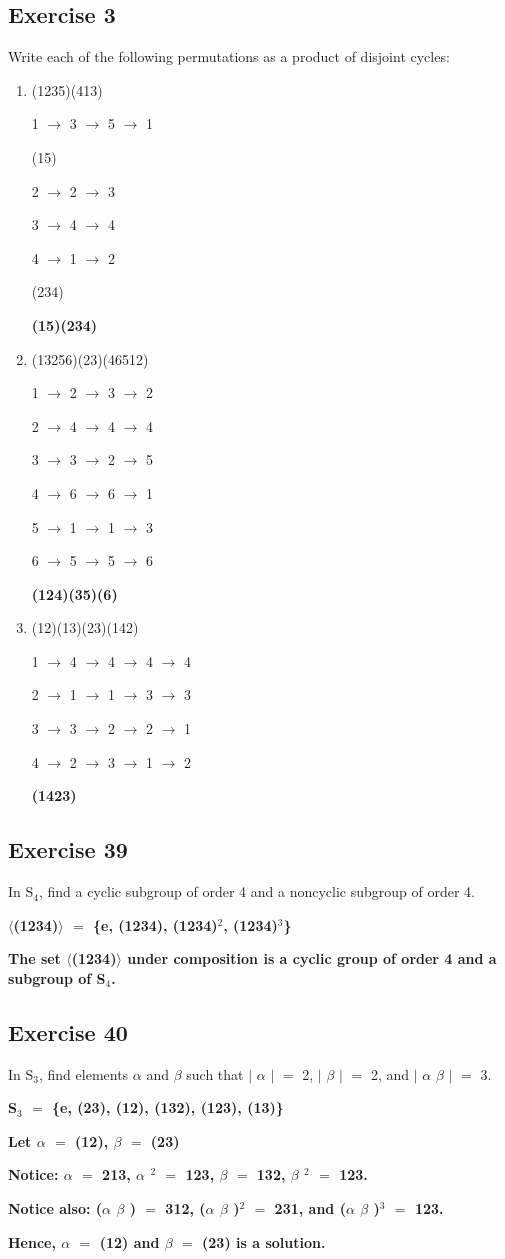 \documentclass{article}
\newcommand{\mt}[1]{\ensuremath{#1}}
\newcommand\ssc[2][\DefaultOpt]{%
  \def\DefaultOpt{#2}%
  \subsection[#1]{#2}%
}
\newcommand{\balist}{\begin{enumerate}[label=\alph*.]}
\newcommand{\elist}{\end{enumerate}}
\newcommand{\afa}{\mt{\alpha} }
\newcommand{\bta}{\mt{\beta} }
\newcommand{\lra}{ \mt{\longrightarrow} } %
\newcommand{\av}[1]{\mt{|}#1\mt{|}}  %
\newcommand{\bk}[1]{\{#1\}}
\newcommand{\abk}[1]{\mt{\langle}#1\mt{\rangle}}
\newcommand{\eql}{\mt{=} }
\newcommand{\uw}[2]{#1\mt{_{#2}}}
\newcommand{\uf}[2]{#1\mt{^{#2}}}
\begin{document}
\ssc{Exercise 3}{

Write each of the following permutations as a product of disjoint cycles:

\balist
\item (1235)(413)

1 \lra 3 \lra 5 \lra 1

(15)

2 \lra 2 \lra 3

3 \lra 4 \lra 4

4 \lra 1 \lra 2

(234)

\textbf{(15)(234)}

\item (13256)(23)(46512)

1 \lra 2 \lra 3 \lra 2

2 \lra 4 \lra 4 \lra 4

3 \lra 3 \lra 2 \lra 5

4 \lra 6 \lra 6 \lra 1

5 \lra 1 \lra 1 \lra 3

6 \lra 5 \lra 5 \lra 6

\textbf{(124)(35)(6)}

\item (12)(13)(23)(142)

1 \lra 4 \lra 4 \lra 4 \lra 4

2 \lra 1 \lra 1 \lra 3 \lra 3

3 \lra 3 \lra 2 \lra 2 \lra 1

4 \lra 2 \lra 3 \lra 1 \lra 2

\textbf{(1423)}
\elist

}

\ssc{Exercise 39}{

In \uw{S}{4}, find a cyclic subgroup of order 4 and a noncyclic subgroup of order 4.

\textbf{\abk{(1234)} \eql \bk{e, (1234), \uf{(1234)}{2}, \uf{(1234)}{3}}}

\textbf{The set \abk{(1234)} under composition is a cyclic group of order 4 and a subgroup of \uw{S}{4}.}

}

\ssc{Exercise 40}{

In \uw{S}{3}, find elements \afa and \bta such that \av{ \afa} \eql 2, \av{ \bta} \eql 2, and \av{ \afa\bta} \eql 3.

\textbf{\uw{S}{3} \eql \bk{e, (23), (12), (132), (123), (13)}
}

\textbf{Let \afa \eql (12), \bta \eql (23)
}

\textbf{Notice: \afa \eql 213, \uf{\afa}{2} \eql 123, \bta \eql 132, \uf{\bta}{2} \eql 123.
}

\textbf{Notice also: (\afa\bta) \eql 312, \uf{(\afa\bta)}{2} \eql 231, and \uf{(\afa\bta)}{3} \eql 123.
}

\textbf{Hence, \afa \eql (12) and \bta \eql (23) is a solution.
}}
\end{document}
